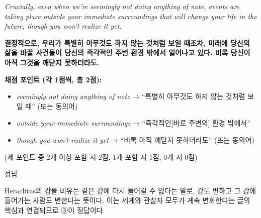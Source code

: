 \documentclass[11pt,a4paper]{article}
\newcommand{\sol}[2]{\vspace{6pt}{\sffamily\bfseries #1} \quad 정답 \fbox{#2}\par\vspace{1pt}}
\begin{document}
\vspace{6pt}{\sffamily\bfseries 3. 서술형 — 해석}\par\vspace{2pt}

\noindent{}\par
\textit{Crucially, even when we're seemingly not doing anything of note, events are taking place outside your immediate surroundings that will change your life in the future, though you won't realize it yet.}

\par\vspace{6pt}
\noindent{}\par
\textbf{결정적으로, 우리가 특별히 아무것도 하지 않는 것처럼 보일 때조차, 미래에 당신의 삶을 바꿀 사건들이 당신의 즉각적인 주변 환경 밖에서 일어나고 있다. 비록 당신이 아직 그것을 깨닫지 못하더라도.}

\par\vspace{4pt}
\noindent\textbf{채점 포인트 (각 1점씩, 총 2점):}
\begin{itemize}[leftmargin=1.5em,itemsep=1pt,topsep=2pt]
  \item \textit{seemingly not doing anything of note} → ``특별히 아무것도 하지 않는 것처럼 보일 때'' (또는 동의어)
  \item \textit{outside your immediate surroundings} → ``즉각적인[바로 주변의] 환경 밖에서''
  \item \textit{though you won't realize it yet} → ``비록 아직 깨닫지 못하더라도'' (또는 동의어)
\end{itemize}
(세 포인트 중 2개 이상 포함 시 2점, 1개 포함 시 1점, 0개 시 0점)

\vspace{8pt}
\sol{4. 함의 추론}{③}
Heraclitus의 강물 비유는 같은 강에 다시 들어갈 수 없다는 말로, 강도 변하고 그 강에 들어가는 사람도 변한다는 뜻이다. 이는 세계와 관찰자 모두가 계속 변화한다는 글의 핵심과 연결되므로 ③이 정답이다.
\end{document}
